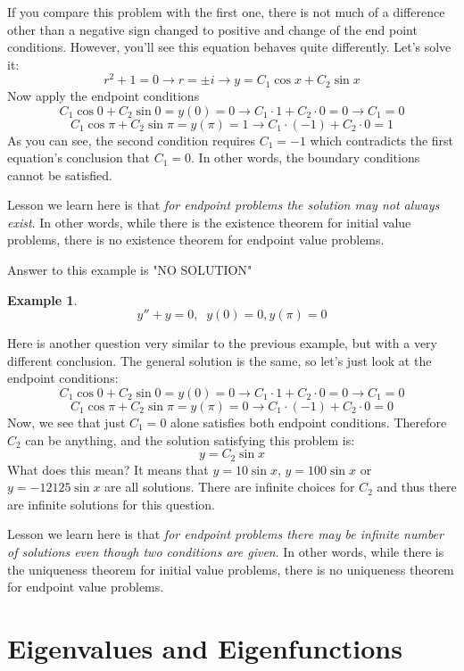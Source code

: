 \documentclass[12pt]{report}
\newtheorem{ex}{Example}[section]
\begin{document}
If you compare this problem with the first one, there is not much of a difference other than a negative sign changed to positive and change of the end point conditions. However, you'll see this equation behaves quite differently. Let's solve it:
$$r^2 + 1=0 \rightarrow r= \pm i \rightarrow y = C_1 \cos x + C_2 \sin x $$
Now apply the endpoint conditions
$$C_1 \cos 0 + C_2 \sin 0 = y(0)=0 \rightarrow C_1 \cdot 1 + C_2 \cdot 0 =0 \rightarrow C_1 =0$$
$$C_1 \cos \pi + C_2 \sin \pi = y(\pi) = 1 \rightarrow C_1 \cdot (-1) + C_2 \cdot 0 = 1$$
As you can see, the second condition requires $C_1 = -1$ which contradicts the first equation's conclusion that $C_1=0$. In other words, the boundary conditions cannot be satisfied.

Lesson we learn here is that \textit{for endpoint problems the solution may not always exist}. In other words, while there is the existence theorem for initial value problems, there is no existence theorem for endpoint value problems.

Answer to this example is "NO SOLUTION"

\begin{ex}
$$y''+y = 0, \; \; y(0)=0,y(\pi)=0$$
\end{ex}
Here is another question very similar to the previous example, but with a very different conclusion. The general solution is the same, so let's just look at the endpoint conditions:
$$C_1 \cos 0 + C_2 \sin 0 = y(0)=0 \rightarrow C_1 \cdot 1 + C_2 \cdot 0 =0 \rightarrow C_1 =0$$
$$C_1 \cos \pi + C_2 \sin \pi = y(\pi) = 0 \rightarrow C_1 \cdot (-1) + C_2 \cdot 0 = 0$$
Now, we see that just $C_1=0$ alone satisfies both endpoint conditions. Therefore $C_2$ can be anything, and the solution satisfying this problem is:
$$y= C_2 \sin x$$
What does this mean? It means that $y=10 \sin x$, $y=100 \sin x$ or $y = -12125 \sin x$ are all solutions. There are infinite choices for $C_2$ and thus there are infinite solutions for this question.

Lesson we learn here is that \textit{for endpoint problems there may be infinite number of solutions even though two conditions are given}. In other words, while there is the uniqueness theorem for initial value problems, there is no uniqueness theorem for endpoint value problems.

\section{Eigenvalues and Eigenfunctions}
\end{document}
